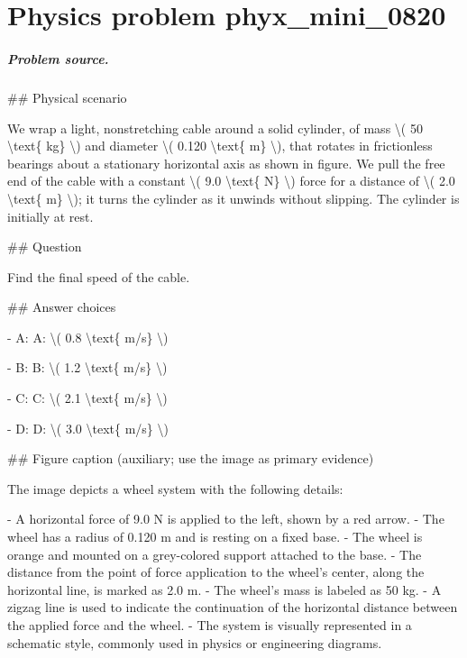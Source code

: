 
\chapter{Physics problem phyx\_mini\_0820}
\label{ch:PhyXMiniProblems_problem_phyx_mini_0820}

\paragraph{Problem source.}
\#\# Physical scenario

We wrap a light, nonstretching cable around a solid cylinder, of mass \textbackslash{}( 50 \textbackslash{}text\{ kg\} \textbackslash{}) and diameter \textbackslash{}( 0.120 \textbackslash{}text\{ m\} \textbackslash{}), that rotates in frictionless bearings about a stationary horizontal axis as shown in figure. We pull the free end of the cable with a constant \textbackslash{}( 9.0 \textbackslash{}text\{ N\} \textbackslash{}) force for a distance of \textbackslash{}( 2.0 \textbackslash{}text\{ m\} \textbackslash{}); it turns the cylinder as it unwinds without slipping. The cylinder is initially at rest.

\#\# Question

Find the final speed of the cable.

\#\# Answer choices

- A: A: \textbackslash{}( 0.8 \textbackslash{}text\{ m/s\} \textbackslash{})

- B: B: \textbackslash{}( 1.2 \textbackslash{}text\{ m/s\} \textbackslash{})

- C: C: \textbackslash{}( 2.1 \textbackslash{}text\{ m/s\} \textbackslash{})

- D: D: \textbackslash{}( 3.0 \textbackslash{}text\{ m/s\} \textbackslash{})

\#\# Figure caption (auxiliary; use the image as primary evidence)

The image depicts a wheel system with the following details:

- A horizontal force of 9.0 N is applied to the left, shown by a red arrow.
- The wheel has a radius of 0.120 m and is resting on a fixed base.
- The wheel is orange and mounted on a grey-colored support attached to the base.
- The distance from the point of force application to the wheel’s center, along the horizontal line, is marked as 2.0 m.
- The wheel's mass is labeled as 50 kg.
- A zigzag line is used to indicate the continuation of the horizontal distance between the applied force and the wheel.
- The system is visually represented in a schematic style, commonly used in physics or engineering diagrams.

